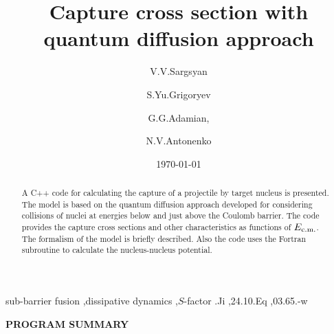 \documentclass[preprint,review,12pt]{elsarticle}
\begin{document}
\begin{frontmatter}

  \title{Capture cross section with quantum diffusion approach}

  \author[a,b]{V.V.Sargsyan}
  \author[a]{S.Yu.Grigoryev  }
  \author[a]{G.G.Adamian, }
  \author[a]{N.V.Antonenko}


  \address[a]{Joint Institute for Nuclear Research, 141980 Dubna, Russia}
  \address[b]{Institut f\"ur Theoretische Physik der Justus--Liebig--Universit\" at, D--35392 Giessen, Germany}

  \date{\today}

  \begin{abstract}
  A C++ code for calculating the capture of a projectile by target nucleus is
  presented.  The model is based on the quantum diffusion approach developed for
  considering collisions of nuclei at energies below and just above the Coulomb barrier. 
  The code provides the capture cross sections and other characteristics as functions
  of $E_{\rm c.m.}$. The formalism of the model is briefly described.
  Also the code uses the Fortran subroutine to calculate the nucleus-nucleus potential.

  \end{abstract}


  \begin{keyword}
  sub-barrier fusion \sep dissipative dynamics \sep $S$-factor
  .Ji \sep 24.10.Eq \sep 03.65.-w

  \end{keyword}

\end{frontmatter}

{\bf\large PROGRAM SUMMARY}
\end{document}
